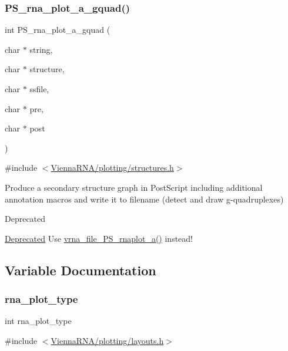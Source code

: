 \subsubsection{\texorpdfstring{P\+S\+\_\+rna\+\_\+plot\+\_\+a\+\_\+gquad()}{PS\_rna\_plot\_a\_gquad()}}
{\footnotesize\ttfamily int P\+S\+\_\+rna\+\_\+plot\+\_\+a\+\_\+gquad (\begin{DoxyParamCaption}\item[{char $\ast$}]{string,  }\item[{char $\ast$}]{structure,  }\item[{char $\ast$}]{ssfile,  }\item[{char $\ast$}]{pre,  }\item[{char $\ast$}]{post }\end{DoxyParamCaption})}



{\ttfamily \#include $<$\hyperlink{plotting_2structures_8h}{Vienna\+R\+N\+A/plotting/structures.\+h}$>$}



Produce a secondary structure graph in Post\+Script including additional annotation macros and write it to \textquotesingle{}filename\textquotesingle{} (detect and draw g-\/quadruplexes) 

\begin{DoxyRefDesc}{Deprecated}
\item[\hyperlink{deprecated__deprecated000162}{Deprecated}]Use \hyperlink{group__plotting__utils_ga139a31dd0ba9fc6612431f67de901c31}{vrna\+\_\+file\+\_\+\+P\+S\+\_\+rnaplot\+\_\+a()} instead! \end{DoxyRefDesc}


\subsection{Variable Documentation}
\mbox{\label{group__plotting__utils_ga5964c4581431b098b80027d6e14dcdd4}} 
\subsubsection{\texorpdfstring{rna\+\_\+plot\+\_\+type}{rna\_plot\_type}}
{\footnotesize\ttfamily int rna\+\_\+plot\+\_\+type}



{\ttfamily \#include $<$\hyperlink{layouts_8h}{Vienna\+R\+N\+A/plotting/layouts.\+h}$>$}



